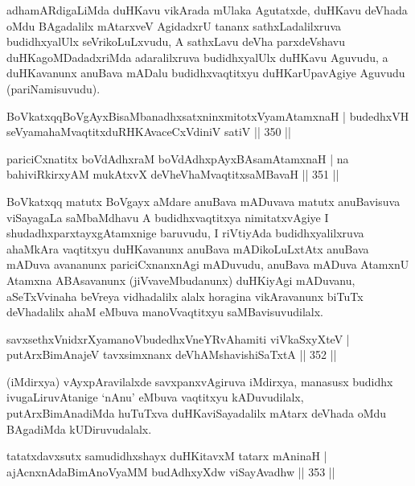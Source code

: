 \begin{artha}
adhamARdigaLiMda duHKavu vikArada mUlaka Agutatxde, duHKavu deVhada oMdu BAgadalilx mAtarxveV AgidadxrU tananx sathxLadalilxruva budidhxyalUlx seVrikoLuLxvudu, A sathxLavu deVha parxdeVshavu duHKagoMDadadxriMda adaralilxruva budidhxyalUlx duHKavu Aguvudu, a duHKavanunx anuBava mADalu budidhxvaqtitxyu duHKarUpavAgiye Aguvudu (pariNamisuvudu).
\end{artha}


\begin{shl}
BoVkatxqqBoVgAyxBisaMbanadhxsatxninxmitotxV\s yamAtamxnaH |
budedhxVH seVyamahaMvaqtitxduRHKAvaceCxVdiniV satiV \hfill || 350 ||
\end{shl}

\begin{shl}
pariciCxnatitx boVdAdhxraM boVdAdhx\s pAyxBAsamAtamxnaH |
na bahiviRkirxyAM mukAtxvX deVheV\s haMvaqtitxsaMBavaH \hfill || 351 ||
\end{shl}

\begin{artha}
BoVkatxqq matutx BoVgayx aMdare anuBava mADuvava matutx anuBavisuva viSayagaLa saMbaMdhavu A budidhxvaqtitxya nimitatxvAgiye I shudadhxparxtayxgAtamxnige baruvudu, I riVtiyAda budidhxyalilxruva ahaMkAra vaqtitxyu duHKavanunx anuBava mADikoLuLxtAtx anuBava mADuva avananunx pariciCxnanxnAgi mADuvudu, anuBava mADuva AtamxnU Atamxna ABAsavanunx (jiVvaveMbudanunx) duHKiyAgi mADuvanu, aSeTxVvinaha beVreya vidhadalilx alalx horagina vikAravanunx biTuTx deVhadalilx ahaM eMbuva manoVvaqtitxyu saMBavisuvudilalx.
\end{artha}


\begin{shl}
savxsethxVnidxrXyamanoVbudedhxVneYRvAhamiti viVkaSxyXteV |
putArxBimAnajeV tavxsimxnanx deVhAMshavishiSaTxtA \hfill || 352 ||
\end{shl}

\begin{artha}
(iMdirxya) vAyxpAravilalxde savxpanxvAgiruva iMdirxya, manasusx budidhx ivugaLiruvAtanige `nAnu' eMbuva vaqtitxyu kADuvudilalx, putArxBimAnadiMda huTuTxva duHKaviSayadalilx mAtarx deVhada oMdu BAgadiMda kUDiruvudalalx.
\end{artha}


\begin{shl}
tatatxdavxsutx samudidhxshayx duHKitavxM tatarx mAninaH |
ajAcnxnAdaBimAnoV\s yaMM budAdhxyXdw viSayAvadhw \hfill || 353 ||
\end{shl}

